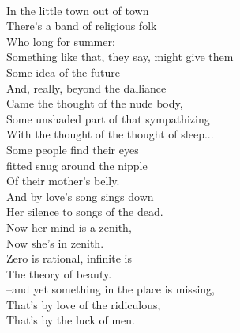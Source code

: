 \documentclass[smalldemyvopaper,11pt,twoside,onecolumn,openright,extrafontsizes]{memoir}
\begin{document}
\\In the little town out of town
\\There's a band of religious folk
\\Who long for summer:
\\Something like that, they say, might give them
\\Some idea of the future
\\And, really, beyond the dalliance
\\Came the thought of the nude body,
\\Some unshaded part of that sympathizing
\\With the thought of the thought of sleep...
\\Some people find their eyes
\\fitted snug around the nipple
\\Of their mother's belly.
\\And by love's song sings down
\\Her silence to songs of the dead.
\\Now her mind is a zenith,
\\Now she's in zenith.
\\Zero is rational, infinite is
\\The theory of beauty.
\\--and yet something in the place is missing,
\\That's by love of the ridiculous,
\\That's by the luck of men.
\end{document}
